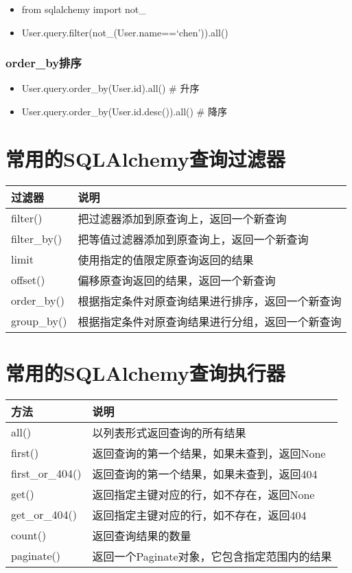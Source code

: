\documentclass[11pt]{article}
\providecommand{\tightlist}{%
      \setlength{\itemsep}{0pt}\setlength{\parskip}{0pt}}
\begin{document}
\begin{itemize}
\tightlist
\item
  from sqlalchemy import not\_
\item
  User.query.filter(not\_(User.name==`chen')).all()
\end{itemize}

\hypertarget{order_byux6392ux5e8f}{%
\subsubsection{order\_by排序}\label{order_byux6392ux5e8f}}

\begin{itemize}
\tightlist
\item
  User.query.order\_by(User.id).all() \# 升序
\item
  User.query.order\_by(User.id.desc()).all() \# 降序
\end{itemize}

    \hypertarget{ux5e38ux7528ux7684sqlalchemyux67e5ux8be2ux8fc7ux6ee4ux5668}{%
\section{常用的SQLAlchemy查询过滤器}\label{ux5e38ux7528ux7684sqlalchemyux67e5ux8be2ux8fc7ux6ee4ux5668}}

\begin{longtable}[]{@{}ll@{}}
\toprule
过滤器 & 说明\tabularnewline
\midrule
\endhead
filter() & 把过滤器添加到原查询上，返回一个新查询\tabularnewline
filter\_by() & 把等值过滤器添加到原查询上，返回一个新查询\tabularnewline
limit & 使用指定的值限定原查询返回的结果\tabularnewline
offset() & 偏移原查询返回的结果，返回一个新查询\tabularnewline
order\_by() &
根据指定条件对原查询结果进行排序，返回一个新查询\tabularnewline
group\_by() &
根据指定条件对原查询结果进行分组，返回一个新查询\tabularnewline
\bottomrule
\end{longtable}

    \hypertarget{ux5e38ux7528ux7684sqlalchemyux67e5ux8be2ux6267ux884cux5668}{%
\section{常用的SQLAlchemy查询执行器}\label{ux5e38ux7528ux7684sqlalchemyux67e5ux8be2ux6267ux884cux5668}}

\begin{longtable}[]{@{}ll@{}}
\toprule
方法 & 说明\tabularnewline
\midrule
\endhead
all() & 以列表形式返回查询的所有结果\tabularnewline
first() & 返回查询的第一个结果，如果未查到，返回None\tabularnewline
first\_or\_404() &
返回查询的第一个结果，如果未查到，返回404\tabularnewline
get() & 返回指定主键对应的行，如不存在，返回None\tabularnewline
get\_or\_404() & 返回指定主键对应的行，如不存在，返回404\tabularnewline
count() & 返回查询结果的数量\tabularnewline
paginate() & 返回一个Paginate对象，它包含指定范围内的结果\tabularnewline
\bottomrule
\end{longtable}
\end{document}
